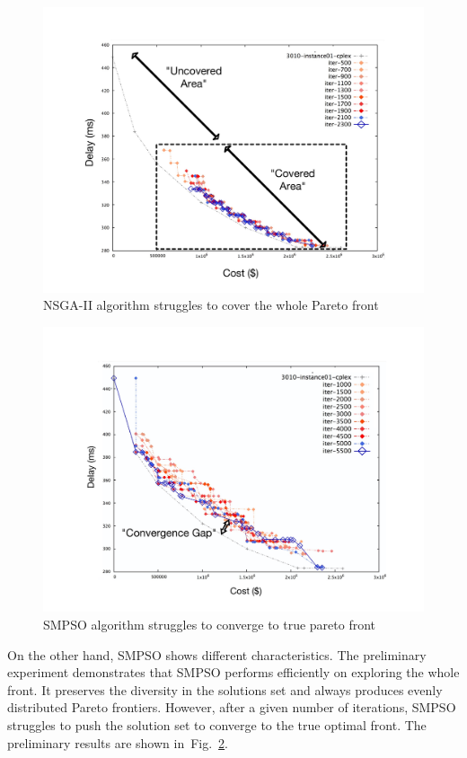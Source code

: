 \documentclass[10pt,journal,compsoc]{IEEEtran}
\newcommand{\Fig}[1]{Fig.~\ref{#1}}
\begin{document}
\begin{figure}[ht]
\centerline{\includegraphics[trim={2cm .5cm 2cm 2cm},clip,width=1.\linewidth]{nsgaitertest_label.pdf}}
\caption{NSGA-II algorithm struggles to cover the whole Pareto front} 
\label{nsgalabel}
\end{figure} 
\begin{figure}[ht]
\centerline{\includegraphics[trim={2cm 1cm 2cm 2cm},clip,width=\linewidth]{SMPSO_iterationtest_label.pdf}}
\caption{SMPSO algorithm struggles to converge to true pareto front} 
\label{smpsolabel}
\end{figure}

On the other hand, SMPSO shows different characteristics. The preliminary experiment demonstrates that SMPSO performs efficiently on exploring the whole front. It preserves the diversity in the solutions set and always produces evenly distributed Pareto frontiers. However, after a given number of iterations, SMPSO struggles to push the solution set to converge to the true optimal front. The preliminary results are shown in~\Fig{smpsolabel}.
\end{document}
